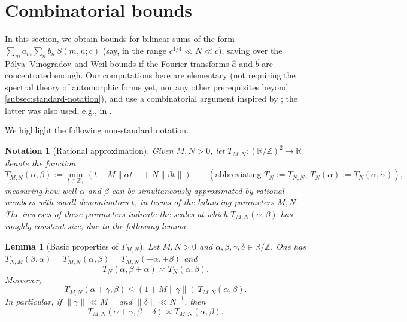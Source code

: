 \documentclass[reqno,11pt]{amsart}
\newtheorem{lemma}[theorem]{Lemma}
\newtheorem{notation}[theorem]{Notation}
\theoremstyle{remark}
\numberwithin{equation}{section}
\newcommand{\Z}{\mathbb{Z}}
\newcommand{\R}{\mathbb{R}}
\renewcommand{\hat}{\widehat}
\begin{document}
\section{Combinatorial bounds} \label{sec:combi}

In this section, we obtain bounds for bilinear sums of the form $\sum_m a_m \sum_n b_n\, S(m, n; c)$ (say, in the range $c^{1/4} \ll N \ll c$), saving over the P\'olya--Vinogradov and Weil bounds if the Fourier transforms $\hat{a}$ and $\hat{b}$ are concentrated enough. Our computations here are elementary (not requiring the spectral theory of automorphic forms yet, nor any other prerequisites beyond \cref{subsec:standard-notation}), and use a combinatorial argument inspired by \cite{cilleruelo2011concentration}; the latter was also used, e.g., in \cite{kerr2023bounds}.

We highlight the following non-standard notation.

\begin{notation}[Rational approximation] \label{not:tn}
Given $M, N > 0$, let $T_{M,N} : (\R/\Z)^2 \to \R$ denote the function
\begin{equation} \label{eq:tn}
    T_{M,N}(\alpha, \beta) := \min_{t \in \Z_+} \left(t + M\|\alpha t\| + N\|\beta t\|\right)
    \qquad (\text{abbreviating } T_N := T_{N,N}, \,
    T_N(\alpha) := T_N(\alpha, \alpha)),
\end{equation}
measuring how well $\alpha$ and $\beta$ can be simultaneously approximated by rational numbers with small denominators $t$, in terms of the balancing parameters $M, N$. The inverses of these parameters indicate the scales at which $T_{M,N}(\alpha, \beta)$ has roughly constant size, due to the following lemma.
\end{notation}

\begin{lemma}[Basic properties of $T_{M,N}$]
Let $M, N > 0$ and $\alpha, \beta, \gamma, \delta \in \R/\Z$. One has $T_{N,M}(\beta, \alpha) = T_{M,N}(\alpha, \beta) = T_{M,N}(\pm \alpha, \pm \beta)$ and
\begin{equation} \label{eq:T-triangle}
    T_N(\alpha, \beta \pm \alpha) \asymp T_N(\alpha, \beta).
\end{equation}
Moreover,
\begin{equation} \label{eq:T-shift}
    T_{M,N}(\alpha + \gamma, \beta) \le (1 + M\|\gamma\|)\, T_{M,N}(\alpha, \beta).
\end{equation}
In particular, if $\|\gamma\| \ll M^{-1}$ and $\|\delta\| \ll N^{-1}$, then
\begin{equation} \label{eq:T-roughly-constant}
    T_{M,N}\left(\alpha + \gamma, \beta + \delta \right)
    \asymp T_{M,N}(\alpha, \beta).
\end{equation}
\end{lemma}
\end{document}
